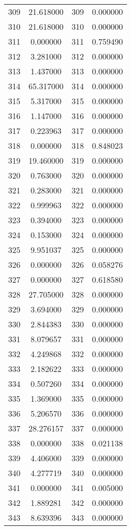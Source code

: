 \documentclass[12pt]{article}
\begin{document}
\begin{longtable}{@{}cccc@{}}
309 & 21.618000 & 309 & 0.000000 \\
310 & 21.618000 & 310 & 0.000000 \\
311 & 0.000000 & 311 & 0.759490 \\
312 & 3.281000 & 312 & 0.000000 \\
313 & 1.437000 & 313 & 0.000000 \\
314 & 65.317000 & 314 & 0.000000 \\
315 & 5.317000 & 315 & 0.000000 \\
316 & 1.147000 & 316 & 0.000000 \\
317 & 0.223963 & 317 & 0.000000 \\
318 & 0.000000 & 318 & 0.848023 \\
319 & 19.460000 & 319 & 0.000000 \\
320 & 0.763000 & 320 & 0.000000 \\
321 & 0.283000 & 321 & 0.000000 \\
322 & 0.999963 & 322 & 0.000000 \\
323 & 0.394000 & 323 & 0.000000 \\
324 & 0.153000 & 324 & 0.000000 \\
325 & 9.951037 & 325 & 0.000000 \\
326 & 0.000000 & 326 & 0.058276 \\
327 & 0.000000 & 327 & 0.618580 \\
328 & 27.705000 & 328 & 0.000000 \\
329 & 3.694000 & 329 & 0.000000 \\
330 & 2.844383 & 330 & 0.000000 \\
331 & 8.079657 & 331 & 0.000000 \\
332 & 4.249868 & 332 & 0.000000 \\
333 & 2.182622 & 333 & 0.000000 \\
334 & 0.507260 & 334 & 0.000000 \\
335 & 1.369000 & 335 & 0.000000 \\
336 & 5.206570 & 336 & 0.000000 \\
337 & 28.276157 & 337 & 0.000000 \\
338 & 0.000000 & 338 & 0.021138 \\
339 & 4.406000 & 339 & 0.000000 \\
340 & 4.277719 & 340 & 0.000000 \\
341 & 0.000000 & 341 & 0.005000 \\
342 & 1.889281 & 342 & 0.000000 \\
343 & 8.639396 & 343 & 0.000000 \\

\end{longtable}
\end{document}
